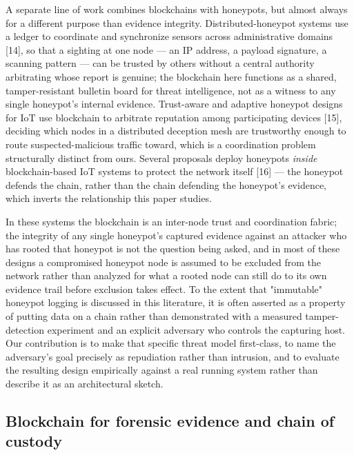 \documentclass[journal]{IEEEtran}
\begin{document}
A separate line of work combines blockchains with honeypots, but almost always for a different purpose than evidence integrity. Distributed-honeypot systems use a ledger to coordinate and synchronize sensors across administrative domains [14], so that a sighting at one node --- an IP address, a payload signature, a scanning pattern --- can be trusted by others without a central authority arbitrating whose report is genuine; the blockchain here functions as a shared, tamper-resistant bulletin board for threat intelligence, not as a witness to any single honeypot's internal evidence. Trust-aware and adaptive honeypot designs for IoT use blockchain to arbitrate reputation among participating devices [15], deciding which nodes in a distributed deception mesh are trustworthy enough to route suspected-malicious traffic toward, which is a coordination problem structurally distinct from ours. Several proposals deploy honeypots \emph{inside} blockchain-based IoT systems to protect the network itself [16] --- the honeypot defends the chain, rather than the chain defending the honeypot's evidence, which inverts the relationship this paper studies.

In these systems the blockchain is an inter-node trust and coordination fabric; the integrity of any single honeypot's captured evidence against an attacker who has rooted that honeypot is not the question being asked, and in most of these designs a compromised honeypot node is assumed to be excluded from the network rather than analyzed for what a rooted node can still do to its own evidence trail before exclusion takes effect. To the extent that "immutable" honeypot logging is discussed in this literature, it is often asserted as a property of putting data on a chain rather than demonstrated with a measured tamper-detection experiment and an explicit adversary who controls the capturing host. Our contribution is to make that specific threat model first-class, to name the adversary's goal precisely as repudiation rather than intrusion, and to evaluate the resulting design empirically against a real running system rather than describe it as an architectural sketch.

\subsection{Blockchain for forensic evidence and chain of custody}
\end{document}
